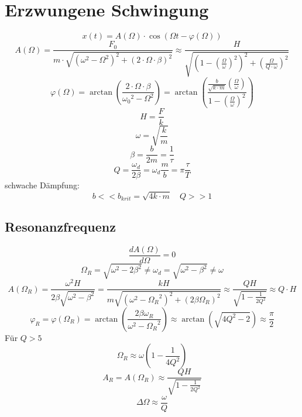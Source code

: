 \section{Erzwungene Schwingung}
\[ \boxed{x(t) = A(\Omega) \cdot \cos(\Omega t - \varphi(\Omega))} \]
\[ \boxed{A(\Omega) = \frac{F_0}{m \cdot 
\sqrt{(\omega^2 - \Omega^2)^2 + (2 \cdot \Omega \cdot \beta)^2}} 
\approx \frac{H}{\sqrt{\left(1 - \left(\frac{\Omega}{\omega}\right)^2\right)^2 
+ \left(\frac{\Omega}{Q \cdot \omega}\right)^2}}} \]  
\[ \boxed{\varphi(\Omega) = \arctan\left(\frac{2 \cdot \Omega \cdot \beta}
{{\omega_0}^2 - \Omega^2}\right) 
= \arctan{\left(\frac{\frac{b}{\sqrt{k \cdot m}} 
\left(\frac{\Omega}{\omega}\right)}
{1 - \left(\frac{\Omega}{\omega}\right)^2}\right)}} \]
\[ \boxed{H = \frac{F}{k}} \]
\[ \boxed{\omega = \sqrt{\frac{k}{m}}} \]
\[ \boxed{\beta = \frac{b}{2 m} = \frac{1}{\tau}} \]
\[ \boxed{Q = \frac{\omega_d}{2\beta} = \omega_d \frac{m}{b} 
= \pi \frac{\tau}{T}} \]
schwache Dämpfung: 
\[ \boxed{b << b_{krit} = \sqrt{4 k \cdot m} \quad Q >> 1} \]

\subsection{Resonanzfrequenz}
\[ \boxed{\frac{d A(\Omega)}{d\Omega} = 0} \]
\[ \boxed{\Omega_R = \sqrt{\omega^2 - 2\beta^2} \neq \omega_d 
= \sqrt{\omega^2 - \beta^2} \neq \omega} \]
\[ \boxed{A(\Omega_R) = \frac{\omega^2 H}{2 \beta \sqrt{\omega^2 - \beta^2}} 
= \frac{k H}{m \sqrt{(\omega^2 - {\Omega_R}^2)^2 + (2\beta\Omega_R)^2}} 
\approx \frac{Q H}{\sqrt{1 - \frac{1}{2 Q^2}}} \approx Q \cdot H} \]
\[ \boxed{\varphi_R = \varphi(\Omega_R) 
= \arctan\left(\frac{2 \beta \omega_R}{\omega^2 - {\Omega_R}^2}\right) 
\approx \arctan\left(\sqrt{4 Q^2 - 2}\right) \approx \frac{\pi}{2}} \]
Für $Q>5$
\[ \boxed{\Omega_R \approx \omega \left(1 - \frac{1}{4Q^2}\right)} \]
\[ \boxed{A_R = A(\Omega_R) \approx \frac{Q H}{\sqrt{1 - \frac{1}{2Q^2}}}} \]
\[ \boxed{\Delta\Omega \approx \frac{\omega}{Q}} \]

